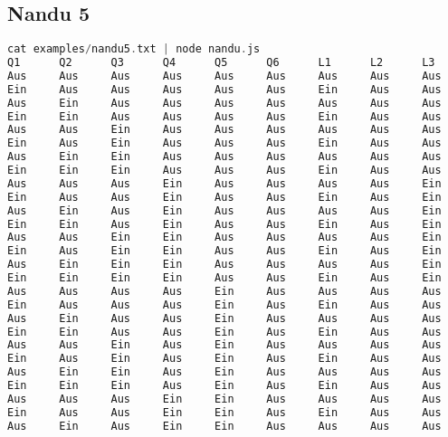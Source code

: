 \documentclass[a4paper,10pt,ngerman]{scrartcl}
\begin{document}
\subsection*{Nandu 5}
\begin{lstlisting}[language=C++]
cat examples/nandu5.txt | node nandu.js
Q1      Q2      Q3      Q4      Q5      Q6      L1      L2      L3      L4      L5
Aus     Aus     Aus     Aus     Aus     Aus     Aus     Aus     Aus     Ein     Aus
Ein     Aus     Aus     Aus     Aus     Aus     Ein     Aus     Aus     Ein     Aus
Aus     Ein     Aus     Aus     Aus     Aus     Aus     Aus     Aus     Ein     Aus
Ein     Ein     Aus     Aus     Aus     Aus     Ein     Aus     Aus     Ein     Aus
Aus     Aus     Ein     Aus     Aus     Aus     Aus     Aus     Aus     Ein     Aus
Ein     Aus     Ein     Aus     Aus     Aus     Ein     Aus     Aus     Ein     Aus
Aus     Ein     Ein     Aus     Aus     Aus     Aus     Aus     Aus     Ein     Aus
Ein     Ein     Ein     Aus     Aus     Aus     Ein     Aus     Aus     Ein     Aus
Aus     Aus     Aus     Ein     Aus     Aus     Aus     Aus     Ein     Aus     Aus
Ein     Aus     Aus     Ein     Aus     Aus     Ein     Aus     Ein     Aus     Aus
Aus     Ein     Aus     Ein     Aus     Aus     Aus     Aus     Ein     Aus     Aus
Ein     Ein     Aus     Ein     Aus     Aus     Ein     Aus     Ein     Aus     Aus
Aus     Aus     Ein     Ein     Aus     Aus     Aus     Aus     Ein     Aus     Aus
Ein     Aus     Ein     Ein     Aus     Aus     Ein     Aus     Ein     Aus     Aus
Aus     Ein     Ein     Ein     Aus     Aus     Aus     Aus     Ein     Aus     Aus
Ein     Ein     Ein     Ein     Aus     Aus     Ein     Aus     Ein     Aus     Aus
Aus     Aus     Aus     Aus     Ein     Aus     Aus     Aus     Aus     Ein     Ein
Ein     Aus     Aus     Aus     Ein     Aus     Ein     Aus     Aus     Ein     Ein
Aus     Ein     Aus     Aus     Ein     Aus     Aus     Aus     Aus     Ein     Ein
Ein     Ein     Aus     Aus     Ein     Aus     Ein     Aus     Aus     Ein     Ein
Aus     Aus     Ein     Aus     Ein     Aus     Aus     Aus     Aus     Ein     Ein
Ein     Aus     Ein     Aus     Ein     Aus     Ein     Aus     Aus     Ein     Ein
Aus     Ein     Ein     Aus     Ein     Aus     Aus     Aus     Aus     Ein     Ein
Ein     Ein     Ein     Aus     Ein     Aus     Ein     Aus     Aus     Ein     Ein
Aus     Aus     Aus     Ein     Ein     Aus     Aus     Aus     Aus     Ein     Ein
Ein     Aus     Aus     Ein     Ein     Aus     Ein     Aus     Aus     Ein     Ein
Aus     Ein     Aus     Ein     Ein     Aus     Aus     Aus     Aus     Ein     Ein

\end{lstlisting}
\end{document}
